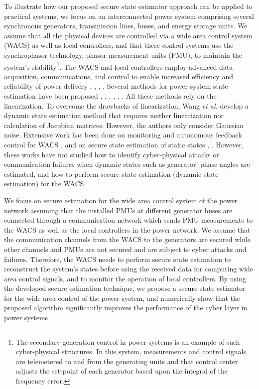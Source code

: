 \documentclass[../thesis.tex]{subfiles}
\begin{document}
To illustrate how our proposed secure state estimator approach can be applied to practical systems, we focus on an interconnected power system comprising several synchronous generators, transmission lines, buses, and energy storage units. We assume that all the physical devices are controlled via a wide area control system (WACS) as well as local controllers, and that these control systems use the synchrophasor technology, phasor measurement units (PMU), to maintain the system's stability\footnote{The secondary generation control in power systems is an example of such cyber-physical structures. In this system, measurements and control signals are telemetered to and from the generating units and that control center adjusts the set-point of each generator based upon the integral of the frequency error.}. The WACS and local controllers employ advanced data acquisition, communications, and control to enable increased efficiency and reliability of power delivery \cite{pmu_w_0}, \cite{pmu_w_1}, \cite{pmu_w_3}, \cite{wacs_ref8}. Several methods for power system state estimation have been proposed \cite{ref_v11}, \cite{ref_v12}, \cite{ref_v13}, \cite{ref_v14}, \cite{ref_v15}, \cite{ref_v16}. %
All these methods rely on the linearization. To overcome the drawbacks of linearization, Wang \textit{et al.} \cite{nonlin_est} develop a dynamic state estimation method that requires neither linearization nor calculation of Jacobian matrices. However, the authors only consider Gaussian noise. Extensive work has been done on monitoring and autonomous feedback control for WACS \cite{wacs_ref8}, and on secure state estimation of static states \cite{ref_v1}, \cite{Tong}. However, these works have not studied how to identify cyber-physical attacks or communication failures when dynamic states such as generator' phase angles are estimated, and how to perform secure state estimation (dynamic state estimation) for the WACS.

We focus on secure estimation for the wide area control system of the power network assuming that the installed PMUs at different generator buses are connected through a communication network which sends PMU measurements to the WACS as well as the local controllers in the power network. We assume that the communication channels from the WACS to the generators are secured while other channels and PMUs are not secured and are subject to cyber attacks and failures. Therefore, the WACS needs to perform secure state estimation to reconstruct the system's states before using the received data for computing wide area control signals, and to monitor the operation of local controllers. By using the developed secure estimation technique, we propose a secure state estimator for the wide area control of the power system, and numerically show that the proposed algorithm significantly improves the performance of the cyber layer in power systems.
\end{document}
